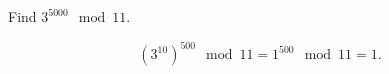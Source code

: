 \question Find $3^{5000} \mod 11.$
\begin{solution}[1 in]
\[(3^{10})^{500}  \mod 11 = 1^{500} \mod 11 = 1.\]
\end{solution}